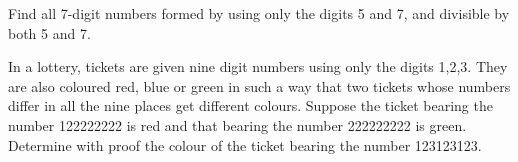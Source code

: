 \item Find all 7-digit numbers formed by using only the digits 5 and 7, and divisible by both 5 and 7.

\item In a lottery, tickets are given nine digit numbers using only the digits 1,2,3. They are also coloured red, blue or green in such a way that two tickets whose numbers differ in all the nine places get different colours. Suppose the ticket bearing the number 122222222 is red and that bearing the number 222222222 is green. Determine with proof the colour of the ticket bearing the number 123123123. 





